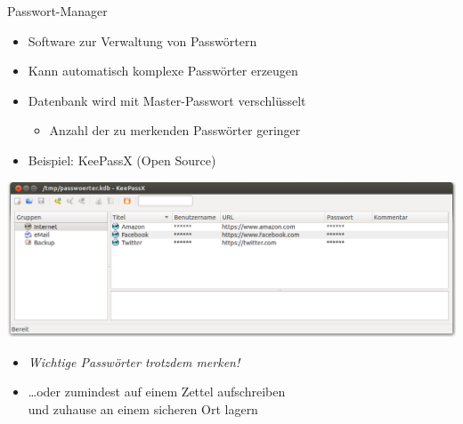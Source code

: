 \begin{frame}{Passwort-Manager}
  \begin{itemize}
    \item Software zur Verwaltung von Passwörtern
    \item Kann automatisch komplexe Passwörter erzeugen
    \item Datenbank wird mit Master-Passwort verschlüsselt
    \begin{itemize}
      \item Anzahl der zu merkenden Passwörter geringer
    \end{itemize}
    \item Beispiel: KeePassX (Open Source)
  \end{itemize}
    \includegraphics[width=\textwidth]{images/keepassx.png}
  \begin{itemize}
    \item \emph{Wichtige Passwörter trotzdem merken!}
    \item \ldots oder zumindest auf einem Zettel aufschreiben\\ und zuhause an einem sicheren Ort lagern
  \end{itemize}
\end{frame}

\endinput

